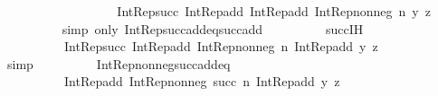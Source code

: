 \begin{isabellebody}
\ \ \ \ \ \ \isamarkupfalse%
\ \isamarkupfalse%
\isanewline
\ \ \ \ \ \ \ \ {\isachardoublequoteopen}{\isachardot}{\kern0pt}{\isachardot}{\kern0pt}{\isachardot}{\kern0pt}\ {\isacharequal}{\kern0pt}\ Int{\isacharunderscore}{\kern0pt}Rep{\isacharunderscore}{\kern0pt}succ\ {\isacharparenleft}{\kern0pt}Int{\isacharunderscore}{\kern0pt}Rep{\isacharunderscore}{\kern0pt}add\ {\isacharparenleft}{\kern0pt}Int{\isacharunderscore}{\kern0pt}Rep{\isacharunderscore}{\kern0pt}add\ {\isacharparenleft}{\kern0pt}Int{\isacharunderscore}{\kern0pt}Rep{\isacharunderscore}{\kern0pt}nonneg\ n{\isacharparenright}{\kern0pt}\ y{\isacharparenright}{\kern0pt}\ z{\isacharparenright}{\kern0pt}{\isachardoublequoteclose}\isanewline
\ \ \ \ \ \ \ \ \isamarkupfalse%
\ {\isacharparenleft}{\kern0pt}simp\ only{\isacharcolon}{\kern0pt}\ Int{\isacharunderscore}{\kern0pt}Rep{\isacharunderscore}{\kern0pt}succ{\isacharunderscore}{\kern0pt}add{\isacharunderscore}{\kern0pt}eq{\isacharunderscore}{\kern0pt}succ{\isacharunderscore}{\kern0pt}add{\isacharparenright}{\kern0pt}\isanewline
\ \ \ \ \ \ \isamarkupfalse%
\ \isamarkupfalse%
\ succ{\isachardot}{\kern0pt}IH\ \isamarkupfalse%
\isanewline
\ \ \ \ \ \ \ \ {\isachardoublequoteopen}{\isachardot}{\kern0pt}{\isachardot}{\kern0pt}{\isachardot}{\kern0pt}\ {\isacharequal}{\kern0pt}\ Int{\isacharunderscore}{\kern0pt}Rep{\isacharunderscore}{\kern0pt}succ\ {\isacharparenleft}{\kern0pt}Int{\isacharunderscore}{\kern0pt}Rep{\isacharunderscore}{\kern0pt}add\ {\isacharparenleft}{\kern0pt}Int{\isacharunderscore}{\kern0pt}Rep{\isacharunderscore}{\kern0pt}nonneg\ n{\isacharparenright}{\kern0pt}\ {\isacharparenleft}{\kern0pt}Int{\isacharunderscore}{\kern0pt}Rep{\isacharunderscore}{\kern0pt}add\ y\ z{\isacharparenright}{\kern0pt}{\isacharparenright}{\kern0pt}{\isachardoublequoteclose}\isanewline
\ \ \ \ \ \ \ \ \isamarkupfalse%
\ simp\isanewline
\ \ \ \ \ \ \isamarkupfalse%
\ \isamarkupfalse%
\ Int{\isacharunderscore}{\kern0pt}Rep{\isacharunderscore}{\kern0pt}nonneg{\isacharunderscore}{\kern0pt}succ{\isacharunderscore}{\kern0pt}add{\isacharunderscore}{\kern0pt}eq\ \isamarkupfalse%
\isanewline
\ \ \ \ \ \ \ \ {\isachardoublequoteopen}{\isachardot}{\kern0pt}{\isachardot}{\kern0pt}{\isachardot}{\kern0pt}\ {\isacharequal}{\kern0pt}\ Int{\isacharunderscore}{\kern0pt}Rep{\isacharunderscore}{\kern0pt}add\ {\isacharparenleft}{\kern0pt}Int{\isacharunderscore}{\kern0pt}Rep{\isacharunderscore}{\kern0pt}nonneg\ {\isacharparenleft}{\kern0pt}succ\ n{\isacharparenright}{\kern0pt}{\isacharparenright}{\kern0pt}\ {\isacharparenleft}{\kern0pt}Int{\isacharunderscore}{\kern0pt}Rep{\isacharunderscore}{\kern0pt}add\ y\ z{\isacharparenright}{\kern0pt}{\isachardoublequoteclose}\isanewline

\end{isabellebody}
